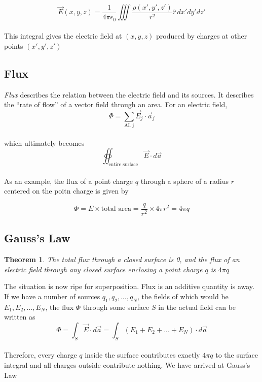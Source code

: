 \documentclass[svgnames]{article}
\newtheorem{theorem}{Theorem}		%
\begin{document}
\[ \vec{E}(x,y,z) = \frac{1}{4\pi\epsilon_0} \iiint \frac{\rho(x',y',z')}{r^2} \hat{r} \, dx'dy'dz' \] \\

This integral gives the electric field at $(x,y,z)$ produced by charges at other points $(x',y',z')$

\subsection{Flux}
  

\textit{Flux} describes the relation between the electric field and its sources. It describes the ``rate of flow'' of a vector field through an area. For an electric field, \\

\[ \Phi = \sum_{\text{All j}} \vec{E}_j \cdot \vec{a}_j \] \\

which ultimately becomes \\ 

\[ \oiint_\text{entire surface} \vec{E} \cdot d\vec{a} \] \\ 

As an example, the flux of a point charge $q$ through a sphere of a radius $r$ centered on the poitn charge is given by

\[ \Phi = E \times \text{total area} = \frac{q}{r^2} \times 4\pi r^2 = 4\pi q \] 

\subsection{Gauss's Law} 

\begin{theorem}
The total flux through a closed surface is 0, and the flux of an electric field through \textit{any} closed surface enclosing a point charge $q$ is $4\pi q$ 
\end{theorem} 

The situation is now ripe for superposition. Flux is an additive quantity is away. If we have a number of sources $q_1,q_2,...,q_N$, the fields of which would be $E_1,E_2,...,E_N$, the flux $\Phi$ through some surface $S$ in the actual field can be written as \\

\[ \Phi = \int_S \vec{E} \cdot d\vec{a} = \int_S (E_1 + E_2 + ... + E_N) \cdot d\vec{a} \] \\

Therefore, every charge $q$ inside the surface contributes exactly $4\pi q$ to the surface integral and all charges outside contribute nothing. We have arrived at Gauss's Law \\ 
\end{document}
